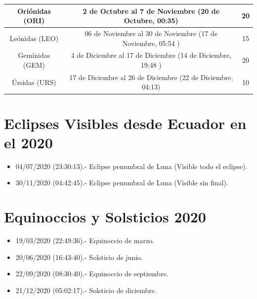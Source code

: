 \documentclass[12pt,a4paper,oneside]{article}
\begin{document}
\begin{table}[h!b!t!]
\begin{center}
{\begin{tabular}{|c|c|c|}
\hline
Ori\'onidas (ORI) & 	2 de Octubre al 7 de Noviembre (20 de Octubre, 00:35) &	20\\ 
\hline 
Le\'onidas (LEO) & 06 de Noviembre al 30 de Noviembre	 (17 de Noviembre, 05:54 ) &	15\\ 
\hline 
\textcolor{blue!80!black}{Gem\'inidas (GEM)} & \textcolor{blue!80!black}{	4 de Diciembre al 17 de Diciembre	 (14 de Diciembre, 19:48 )} &	\textcolor{blue!80!black}{20}\\ 
\hline 
\'Ursidas (URS) &	17 de Diciembre al 26 de Diciembre	 (22 de Diciembre, 04:13) & 10\\ 
\hline 
 \end{tabular} }
\end{center}
\end{table}

\vspace{0.5cm}
\section{Eclipses Visibles desde Ecuador en el 2020}
\begin{itemize}
\item 04/07/2020 (23:30:13).- Eclipse penumbral de Luna (Visible todo el eclipse).
\item 30/11/2020 (04:42:45).- Eclipse penumbral de Luna (Visible sin final).
\end{itemize}
\section{Equinoccios y Solsticios 2020}
\begin{itemize}
\item 19/03/2020 (22:49:36).- Equinoccio de marzo.
\item 20/06/2020 (16:43:40).- Solsticio de junio.
\item 22/09/2020 (08:30:40).- Equinoccio de septiembre.
\item 21/12/2020 (05:02:17).- Solsticio de diciembre.
\end{itemize}
\newpage
\end{document}
